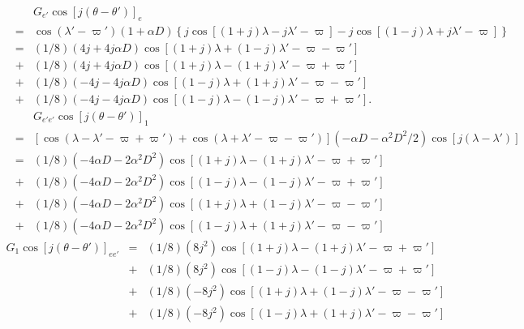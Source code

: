 \documentclass [12pt, a4paper] {article}
\begin{document}
\begin {eqnarray}
    &\:&
    G_{e'}\cos[j(\theta - \theta')]_{e}
    \\\nonumber
    &=&
    \cos(\lambda' - \varpi')(1 + \alpha D)
    \left\{
        j\cos[(1+j)\lambda - j\lambda' - \varpi]
        -
        j\cos[(1-j)\lambda + j\lambda' - \varpi]
    \right\}
    \\
    &=&
    (1/8)\left(4j + 4j\alpha D\right)
    \cos[(1 + j)\lambda + (1 - j)\lambda' - \varpi - \varpi']
    \\\nonumber 
    &+&
    (1/8)\left(4j + 4j\alpha D\right)
    \cos[(1 + j)\lambda - (1 + j)\lambda' - \varpi + \varpi']
    \\\nonumber 
    &+&
    (1/8)\left(-4j - 4j\alpha D\right)
    \cos[(1 - j)\lambda + (1 + j)\lambda' - \varpi - \varpi']
    \\\nonumber 
    &+&
    (1/8)\left(-4j - 4j\alpha D\right)
    \cos[(1 - j)\lambda - (1 - j)\lambda' - \varpi + \varpi'].
\end {eqnarray}
\begin {eqnarray}
    &\:&
    G_{e'e'}\cos[j(\theta - \theta')]_{1}
    \\\nonumber
    &=&
    \left[
        \cos(\lambda - \lambda' - \varpi + \varpi')
        +
        \cos(\lambda + \lambda' - \varpi - \varpi')    
    \right](-\alpha D - \alpha^2D^2/2)\cos[j(\lambda - \lambda')]
    \\
    &=& 
    (1/8)
    \left(
        -4\alpha D - 2 \alpha^2D^2
    \right)
    \cos[(1 + j)\lambda - (1 + j)\lambda' - \varpi + \varpi']
    \\\nonumber 
    &+&
    (1/8)
    \left(
        -4\alpha D - 2 \alpha^2D^2
    \right)
    \cos[(1 - j)\lambda - (1 - j)\lambda' - \varpi + \varpi']
    \\\nonumber 
    &+&
    (1/8)
    \left(
        -4\alpha D - 2 \alpha^2D^2
    \right)
    \cos[(1 + j)\lambda + (1 - j)\lambda' - \varpi - \varpi']
    \\\nonumber 
    &+&
    (1/8)
    \left(
        -4\alpha D - 2 \alpha^2D^2
    \right)
    \cos[(1 - j)\lambda + (1 + j)\lambda' - \varpi - \varpi']
\end {eqnarray}
\begin {eqnarray}
    G_1\cos[j(\theta - \theta')]_{ee'}
    &=&
    (1/8)(8j^2)\cos[(1+j)\lambda - (1+j)\lambda' - \varpi + \varpi']
    \\\nonumber
    &+&
    (1/8)(8j^2)\cos[(1-j)\lambda - (1-j)\lambda' - \varpi + \varpi']
    \\\nonumber 
    &+&
    (1/8)(-8j^2)\cos[(1+j)\lambda + (1-j)\lambda' - \varpi - \varpi']
    \\\nonumber 
    &+&
    (1/8)(-8j^2)\cos[(1-j)\lambda + (1+j)\lambda' - \varpi - \varpi']
\end {eqnarray}
\end{document}
